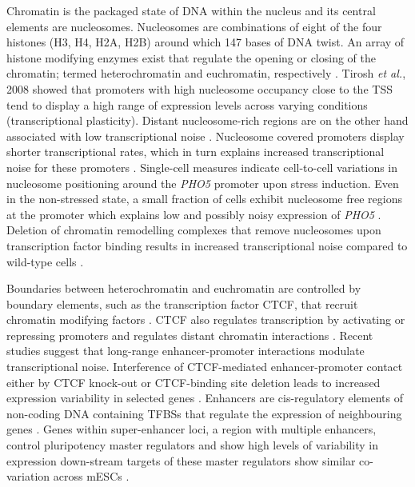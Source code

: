 Chromatin is the packaged state of DNA within the nucleus and its central elements are nucleosomes. 
Nucleosomes are combinations of eight of the four histones (H3, H4, H2A, H2B) around which 147 bases of DNA twist. 
An array of histone modifying enzymes exist that regulate the opening or closing of the chromatin; termed heterochromatin and euchromatin, respectively \citep{Kouzarides2007}. 
Tirosh \textit{et al.}, 2008 showed that promoters with high nucleosome occupancy close to the TSS tend to display a high range of expression levels across varying conditions (transcriptional plasticity). 
Distant nucleosome-rich regions are on the other hand associated with low transcriptional noise \citep{Tirosh2008}. 
Nucleosome covered promoters display shorter transcriptional rates, which in turn explains increased transcriptional noise for these promoters \cite{Dey2015}. 
Single-cell measures indicate cell-to-cell variations in nucleosome positioning around the \textit{PHO5} promoter upon stress induction. 
Even in the non-stressed state, a small fraction of cells exhibit nucleosome free regions at the promoter which explains low and possibly noisy expression of \textit{PHO5} \citep{Small2014}. 
Deletion of chromatin remodelling complexes that remove nucleosomes upon transcription factor binding results in increased transcriptional noise compared to wild-type cells \citep{Raser2004}. 

\newpage

Boundaries between heterochromatin and euchromatin are controlled by boundary elements, such as the transcription factor \Gls{CTCF}, that recruit chromatin modifying factors \citep{Kouzarides2007}. 
CTCF also regulates transcription by activating or repressing promoters and regulates distant chromatin interactions \citep{Kim2015a}. 
Recent studies suggest that long-range enhancer-promoter interactions modulate transcriptional noise. 
Interference of CTCF-mediated enhancer-promoter contact either by CTCF knock-out or CTCF-binding site deletion leads to increased expression variability in selected genes \citep{Ren2017}. 
Enhancers are cis-regulatory elements of non-coding DNA containing TFBSs that regulate the expression of neighbouring genes \citep{Blackwood1998}. 
Genes within super-enhancer loci, a region with multiple enhancers, control pluripotency master regulators and show high levels of variability in expression down-stream targets of these master regulators show similar co-variation across mESCs \citep{Faure2017}.

